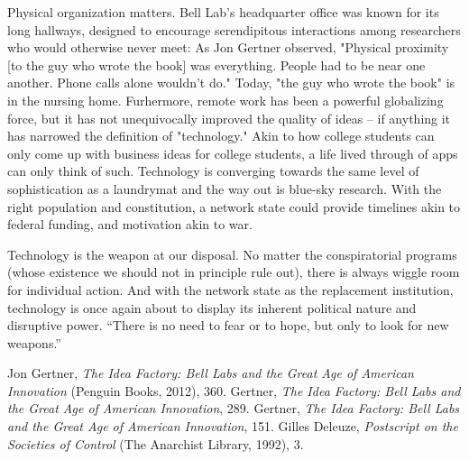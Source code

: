 \documentclass[12pt]{article}
\begin{document}
Physical organization matters. Bell Lab's headquarter office was known for its long hallways, designed to encourage serendipitous interactions among researchers who would otherwise never meet: As Jon Gertner observed, "Physical proximity [to the guy who wrote the book] was everything. People had to be near one another. Phone calls alone wouldn't do."\cite{ref3} Today, "the guy who wrote the book" is in the nursing home. Furhermore, remote work has been a powerful globalizing force, but it has not unequivocally improved the quality of ideas – if anything it has narrowed the definition of "technology." Akin to how college students can only come up with business ideas for college students, a life lived through of apps can only think of such. Technology is converging towards the same level of sophistication as a laundrymat and the way out is blue-sky research. With the right population and constitution, a network state could provide timelines akin to federal funding, and motivation akin to war.

Technology is the weapon at our disposal. No matter the conspiratorial programs (whose existence we should not in principle rule out), there is always wiggle room for individual action. And with the network state as the replacement institution, technology is once again about to display its inherent political nature and disruptive power. “There is no need to fear or to hope, but only to look for new weapons.”\cite{ref4}

\begin{thebibliography}{9}
Jon Gertner, \textit{The Idea Factory: Bell Labs and the Great Age of American Innovation} (Penguin Books, 2012), 360.
Gertner, \textit{The Idea Factory: Bell Labs and the Great Age of American Innovation}, 289.
Gertner, \textit{The Idea Factory: Bell Labs and the Great Age of American Innovation}, 151.
Gilles Deleuze, \textit{Postscript on the Societies of Control} (The Anarchist Library, 1992), 3.
\end{thebibliography}
\end{document}
